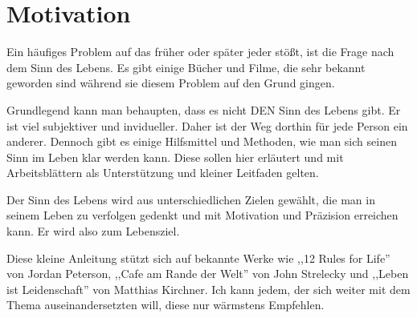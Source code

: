 \documentclass[../Lebensziel.tex]{subfiles}
\begin{document}
\chapter{Motivation}\thispagestyle{fancy}

Ein häufiges Problem auf das früher oder später jeder stößt, ist die Frage nach dem Sinn des Lebens. Es gibt einige Bücher und Filme, die sehr bekannt geworden sind während sie diesem Problem auf den Grund gingen. 
\vspace{1cm}

Grundlegend kann man behaupten, dass es nicht DEN Sinn des Lebens gibt. Er ist viel subjektiver und invidueller. Daher ist der Weg dorthin für jede Person ein anderer. Dennoch gibt es einige Hilfsmittel und Methoden, wie man sich seinen Sinn im Leben klar werden kann. Diese sollen hier erläutert und mit Arbeitsblättern als Unterstützung und kleiner Leitfaden gelten.

Der Sinn des Lebens wird aus unterschiedlichen Zielen gewählt, die man in seinem Leben zu verfolgen gedenkt und mit Motivation und Präzision erreichen kann. Er wird also zum Lebensziel.
\vspace{1cm}

Diese kleine Anleitung stützt sich auf bekannte Werke wie ,,12 Rules for Life''\cite{rules-for-life} von Jordan Peterson, ,,Cafe am Rande der Welt''\cite{cafe-rande-welt} von John Strelecky und ,,Leben ist Leidenschaft''\cite{leben-leidenschaft} von Matthias Kirchner. Ich kann jedem, der sich weiter mit dem Thema auseinandersetzten will, diese nur wärmstens Empfehlen.
\end{document}
